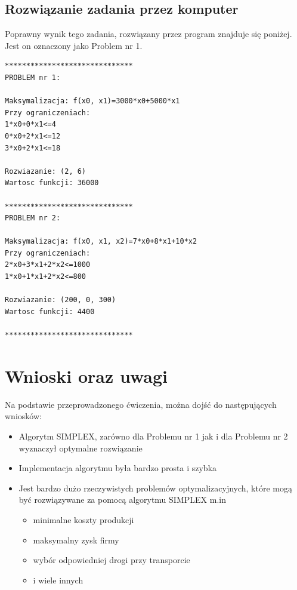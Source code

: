 \documentclass[10pt,a4paper]{article}
\begin{document}
\subsection{Rozwiązanie zadania przez komputer}

Poprawny wynik tego zadania, rozwiązany przez program znajduje się poniżej. Jest on
oznaczony jako Problem nr 1.

\begin{lstlisting}[caption={Wyjście konsoli, pokazujące, działanie napisanego programu.}]
******************************
PROBLEM nr 1:

Maksymalizacja: f(x0, x1)=3000*x0+5000*x1
Przy ograniczeniach:
1*x0+0*x1<=4
0*x0+2*x1<=12
3*x0+2*x1<=18

Rozwiazanie: (2, 6)
Wartosc funkcji: 36000

******************************
PROBLEM nr 2:

Maksymalizacja: f(x0, x1, x2)=7*x0+8*x1+10*x2
Przy ograniczeniach:
2*x0+3*x1+2*x2<=1000
1*x0+1*x1+2*x2<=800

Rozwiazanie: (200, 0, 300)
Wartosc funkcji: 4400

******************************
\end{lstlisting}


\section{Wnioski oraz uwagi}
Na podstawie przeprowadzonego ćwiczenia, można dojść do następujących wniosków:
\begin{itemize}
\item Algorytm SIMPLEX, zarówno dla Problemu nr 1 jak i dla Problemu nr 2 wyznaczył
optymalne rozwiązanie
	\item Implementacja algorytmu była bardzo prosta i szybka
	\item Jest bardzo dużo rzeczywistych problemów optymalizacyjnych, które mogą być
		rozwiązywane za pomocą algorytmu SIMPLEX m.in
	\begin{itemize}
		\item minimalne koszty produkcji
		\item maksymalny zysk firmy
		\item wybór odpowiedniej drogi przy transporcie
		\item i wiele innych
	\end{itemize}
\end{itemize}
\end{document}
